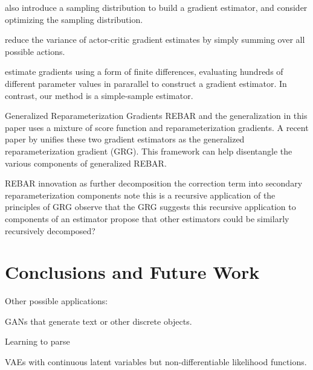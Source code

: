 \documentclass{article}
\begin{document}
\citet{wierstra2014natural} also introduce a sampling distribution to build a gradient estimator, and consider optimizing the sampling distribution.

\citet{asadi2017mean} reduce the variance of actor-critic gradient estimates by simply summing over all possible actions.

\citet{salimans2017evolution} estimate gradients using a form of finite differences, evaluating hundreds of different parameter values in pararallel to construct a gradient estimator.
In contrast, our method is a simple-sample estimator.

\par{Generalized Reparameterization Gradients}
REBAR and the generalization in this paper uses a mixture of score function and reparameterization gradients.
A recent paper by \cite{ruiz2016generalized} unifies these two gradient estimators as the generalized reparameterization gradient (GRG).
This framework can help disentangle the various components of generalized REBAR.

REBAR innovation as further decomposition the correction term into secondary reparameterization components
note this is a recursive application of the principles of GRG
observe that the GRG suggests this recursive application to components of an estimator
propose that other estimators could be similarly recursively decomposed?




\section{Conclusions and Future Work}
\label{conclusion}

Other possible applications:

GANs \citep{goodfellow2014generative} that generate text or other discrete objects.

Learning to parse \citep{kusner2017grammar}

VAEs with continuous latent variables but non-differentiable likelihood functions.





\end{document}
